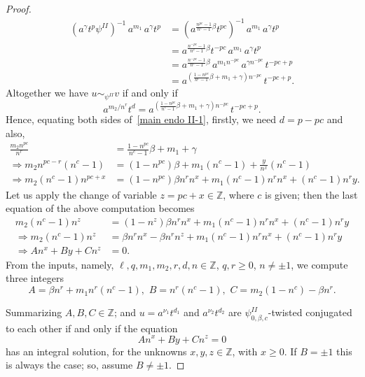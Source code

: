 \documentclass[a4paper]{amsart}
\theoremstyle{definition}
\newcommand\ZZ{\mathbb{Z}}
\begin{document}
\begin{proof}
%
\begin{align*}
    (a^{\gamma}t^p \psi^{II})^{-1} \, a^{m_1} \, a^{\gamma}t^p 
    &= (a^{\frac{n^{pc} -1}{n^c -1}\beta}t^{pc})^{-1} \, a^{m_1} \, a^{\gamma}t^p \\
    &= a^{\frac{n^{-pc} -1}{n^c -1}\beta}t^{-pc} \, a^{m_1} \, a^{\gamma}t^p \\
    &= a^{\frac{n^{-pc} -1}{n^c -1}\beta} \, a^{m_1n^{-pc}} \, a^{\gamma n^{-pc}} \, t^{-pc+p}\\
    &= a^{(\frac{1 - n^{pc}}{n^c -1}\beta + m_1 + \gamma)n^{-pc}} \, t^{-pc+p}.
\end{align*}
%
Altogether we have $u \sim_{\psi^{II}} v$ if and only if 
%
\begin{equation}\label{main endo II-1}
  a^{m_2/n^r} t^d = a^{(\frac{1 - n^{pc}}{n^c -1}\beta + m_1 + \gamma)n^{-pc}} \, t^{-pc+p}.  
\end{equation}
%
Hence, equating both sides of~\eqref{main endo II-1}, firstly, we need $d = p-pc$ and also,
%
\begin{align*}
    \frac{m_2n^{pc}}{n^r} & = \frac{1 - n^{pc}}{n^c -1}\beta + m_1 + \gamma\\
    \Rightarrow m_2n^{pc-r}(n^c - 1) & = (1 - n^{pc})\beta + m_1(n^c - 1) + \frac{y}{n^x}(n^c - 1)\\
    \Rightarrow m_2(n^c - 1)n^{pc+x} & = (1 - n^{pc})\beta n^r n^x + m_1(n^c - 1) n^r n^x + (n^c - 1) n^r y.
\end{align*}
%
Let us apply the change of variable $z = pc + x\in \ZZ$, where $c$ is given; then the last equation of the above computation becomes
%
\begin{align*}
m_2(n^c - 1)n^{ z} & = (1 - n^{z})\beta n^r n^x + m_1(n^c - 1) n^r n^x + (n^c - 1) n^r y \\
\Rightarrow m_2(n^c - 1)n^{ z} & = \beta n^r n^x - \beta n^r n^{ z} + m_1(n^c - 1) n^r n^x + (n^c - 1) n^r y\\
\Rightarrow An^x + By + Cn^{ z} & =0.
\end{align*}
%
From the inputs, namely, $\ell, q, m_1, m_2, r, d, n \in \ZZ$, $q, r \geq 0$, $n \neq \pm 1$, we compute three integers
\[
A = \beta n^r + m_1n^r(n^c-1), \, \, B= n^r(n^c -1), \, \, C = m_2(1-n^c) - \beta n^r.
\]

Summarizing $A,B,C\in \ZZ$; and $u = a^{\nu_1} t^{d_1}$ and $a^{\nu_2} t^{d_2}$ are $\psi^{II}_{0, \beta, c}$-twisted conjugated to each other if and only if the equation 
 \begin{equation}\label{equ: main endo II-2}
An^x +By + Cn^z = 0
 \end{equation}
has an integral solution, for the unknowns $x,y,z\in \ZZ$, with $x\geq 0$. If $B=\pm 1$ this is always the case; so, assume $B\neq \pm 1$.


\end{proof}
\end{document}
